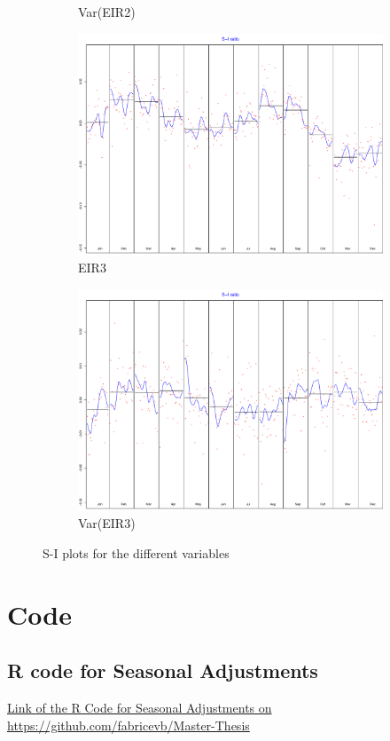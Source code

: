 \documentclass[12pt,a4paper,oneside]{book}
\begin{document}
\begin{figure}
\begin{subfigure}{.5\textwidth}
  \caption{Var(EIR2)}
\end{subfigure}
\begin{subfigure}{.5\textwidth}
  \centering
  \includegraphics[width=.8\linewidth]{Graphs/S-I_7.pdf}
  \caption{EIR3}
\end{subfigure}
\begin{subfigure}{.5\textwidth}
  \centering
  \includegraphics[width=.8\linewidth]{Graphs/S-I_8.pdf}
  \caption{Var(EIR3)}
\end{subfigure}
\caption{S-I plots for the different variables}
\label{fig:S-I seasonal correction RJDemetra}
\end{figure}





\chapter*{Code}
\section*{R code for Seasonal Adjustments}
\href{https://github.com/fabricevb/Master-Thesis/blob/master/R/20Code/Seasonal/20Correction%20model%20data.R}{Link of the R Code for Seasonal Adjustments on https://github.com/fabricevb/Master-Thesis}
\end{document}

